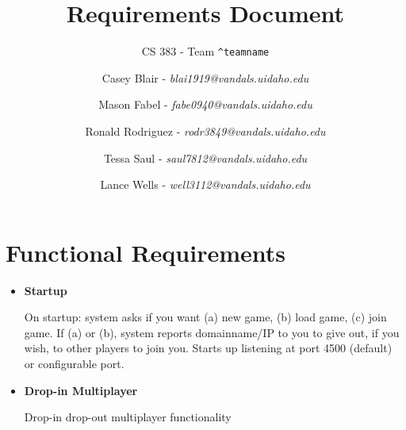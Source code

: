 \documentclass[12pt]{article}
\title{Requirements Document}
\subtitle{CS 383 - Team \texttt{\textasciicircum teamname}}
\author{
Casey Blair - \textit{blai1919@vandals.uidaho.edu} \\
\and Mason Fabel - \textit{fabe0940@vandals.uidaho.edu} \\
\and Ronald Rodriguez - \textit{rodr3849@vandals.uidaho.edu} \\
\and Tessa Saul - \textit{saul7812@vandals.uidaho.edu} \\
\and Lance Wells - \textit{well3112@vandals.uidaho.edu} \\
}
\begin{document}
\maketitle

\section{Functional Requirements}
\begin{itemize}
	\item \textbf{Startup}
	
	On startup: system asks if you want (a) new game, (b) load game, (c)
	join game. If (a) or (b), system reports domainname/IP to you to give
	out, if you wish, to other players to join you. Starts up listening at
	port 4500 (default) or configurable port.
	
	\item \textbf{Drop-in Multiplayer}
	
	 Drop-in drop-out multiplayer functionality
\end{itemize}
\end{document}
